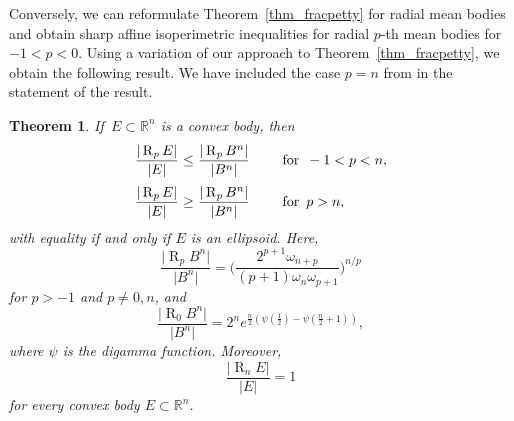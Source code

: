 \documentclass{amsart}
\newtheorem{theorem}{Theorem}
\newcommand{\omr}[1]{\operatorname{R}_{#1}}
\newcommand{\Bvtex}{{B^n}}
\newcommand{\vol}[1]{ \vert #1\vert}
\begin{document}
Conversely, we can reformulate Theorem~\ref{thm_fracpetty} for radial mean
bodies and obtain sharp affine isoperimetric inequalities for radial
$p$-th mean bodies for $-1<p<0$. Using a variation of our approach to Theorem~\ref{thm_fracpetty}, we obtain the following result. We have included the
case $p=n$ from \cite[Lemma 5.7]{GZ} in the statement of the result.

\begin{theorem}%
\label{thm_meanradial}
If $\,E\subset \mathbb R^{n}$ is a convex body, then
%
\begin{equation}
\label{eq_inequalities}
%
\begin{array}{r@{\hspace*{3pt}}c@{\hspace*{3pt}}ll}
\displaystyle \frac{\vol{\omr{p} E}}{\vol{ E}} &\le &\displaystyle
\frac{\vol{\omr{p} \Bvtex}}{\vol{\Bvtex}}&\quad \text{ for } \,-1<p<n,
\\[12pt]
\displaystyle \frac{\vol{\omr{p} E}}{\vol{ E}}&\ge &\displaystyle
\frac{\vol{\omr{p} \Bvtex}}{\vol{\Bvtex}}&\quad \text{ for }\,p>n,
\end{array}
%
\end{equation}
%
with equality if and only if $E$ is an ellipsoid. Here,
%
\begin{equation}
\frac{\vol{\omr{p} \Bvtex}}{\vol{\Bvtex}}=\displaystyle \Big(
\frac{2^{p+1}\omega _{n+p}}{(p+1)\omega _{n}\omega _{p+1}}\Big)^{n/p}
\nonumber \end{equation}
%
for $p>-1$ and $p\ne 0,n$, and
%
\begin{equation*}
\frac{\vol{\omr 0 \Bvtex}}{\vol{\Bvtex}}=2^{n} e^{\frac {n}{2}(\psi (
\frac{1}{2})-\psi (\frac{n}{2}+1))},
\end{equation*}
%
where $\psi $ is the digamma function. Moreover,
%
\begin{equation*}
\frac{\vol{\omr n E}}{\vol{E}}=1
\end{equation*}
%
for every convex body $E\subset \mathbb R^{n}$.
\end{theorem}

\end{document}
